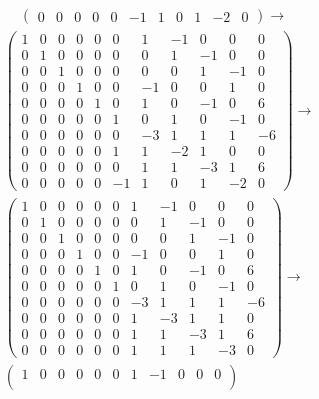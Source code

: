 ﻿\documentclass{book} \usepackage{exsheets} \usepackage{xeCJK}
\begin{document}
\begin{solution}
\begin{align*}
\begin{pmatrix}
                                                                                                0&0&0&0&0&-1&1&0&1&-2&0
                                                                                              \end{pmatrix}
                                                                                                                       \to
\end{align*}
\begin{align*}
  &
    \begin{pmatrix}
      1&0&0&0&0&0&1&-1&0&0&0\\
      0&1&0&0&0&0&0&1&-1&0&0\\
      0&0&1&0&0&0&0&0&1&-1&0\\
      0&0&0&1&0&0&-1&0&0&1&0\\
      0&0&0&0&1&0&1&0&-1&0&6\\
      0&0&0&0&0&1&0&1&0&-1&0\\
      0&0&0&0&0&0&-3&1&1&1&-6\\
      0&0&0&0&0&1&1&-2&1&0&0\\
      0&0&0&0&0&0&1&1&-3&1&6\\
      0&0&0&0&0&-1&1&0&1&-2&0
    \end{pmatrix}\to\\&
                        \begin{pmatrix}
                          1&0&0&0&0&0&1&-1&0&0&0\\
                          0&1&0&0&0&0&0&1&-1&0&0\\
                          0&0&1&0&0&0&0&0&1&-1&0\\
                          0&0&0&1&0&0&-1&0&0&1&0\\
                          0&0&0&0&1&0&1&0&-1&0&6\\
                          0&0&0&0&0&1&0&1&0&-1&0\\
                          0&0&0&0&0&0&-3&1&1&1&-6\\
                          0&0&0&0&0&0&1&-3&1&1&0\\
                          0&0&0&0&0&0&1&1&-3&1&6\\
                          0&0&0&0&0&0&1&1&1&-3&0
                        \end{pmatrix}\to\\&
                                            \begin{pmatrix}
                                              1&0&0&0&0&0&1&-1&0&0&0\\

\end{pmatrix}
\end{align*}
\end{solution}
\end{document}
